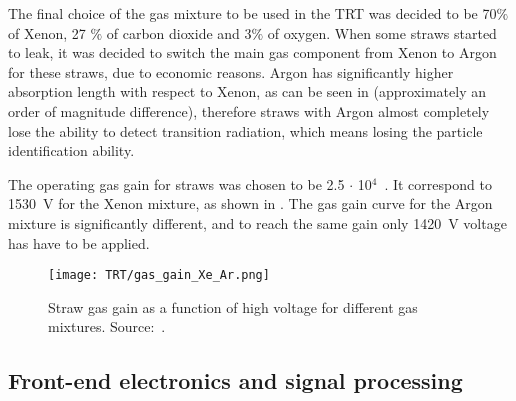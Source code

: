 The final choice of the gas mixture to be used in the TRT was decided to be 70$\%$ of Xenon, 27 $\%$ of carbon dioxide and 3$\%$ of oxygen.
When some straws started to leak, it was decided to switch the main gas component from Xenon to Argon for these straws, due to economic reasons.
Argon has significantly higher absorption length with respect to Xenon, as can be seen in  (approximately an order of magnitude difference), 
therefore straws with Argon almost completely lose the ability to detect transition radiation, 
which means losing the particle identification ability.

The operating gas gain for straws was chosen to be 2.5 $\cdot$ 10$^4$~\cite{ID_TDR_vol1}. It correspond to 1530~V for the Xenon mixture, as shown in .
The gas gain curve for the Argon mixture is significantly different, and to reach the same gain only 1420~V voltage has have to be applied.

\begin{figure}
\centering
\texttt{[image: TRT/gas\_gain\_Xe\_Ar.png]}
\caption{ 
Straw gas gain as a function of high voltage for different gas mixtures. Source:~\cite{Abat:2008zza}.
}
\label{fig:gas_gain}
\end{figure}



\subsection{Front-end electronics and signal processing}
\label{subsubsec:front_end_electronics}


